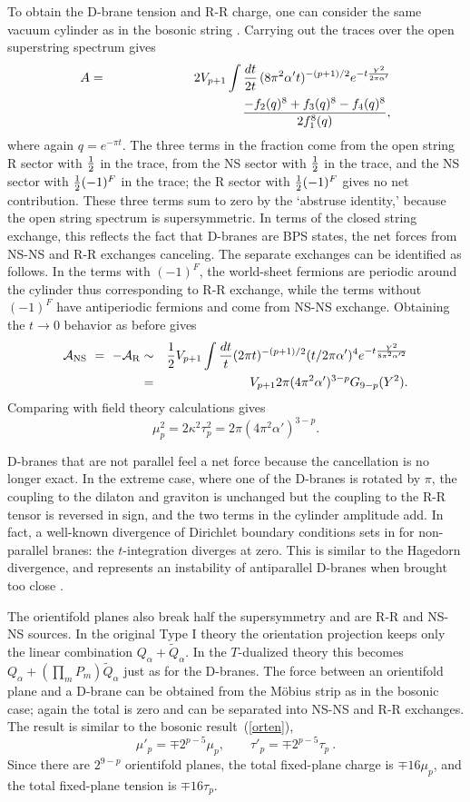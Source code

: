 \documentclass[12pt]{article}
\def\be{\begin{equation}}
\def\ee{\end{equation}}
\def\bea{\begin{eqnarray}}
\def\eea{\end{eqnarray}}
\def\ap{\alpha'}
\begin{document}
To obtain the D-brane tension and R-R charge, one can consider the same
vacuum cylinder as in the bosonic string \cite{joeone}.
Carrying out the traces over the open superstring spectrum
gives
\bea
A &=& 2V_{p+1} \int {dt\over 2t}\, (8\pi^2 \ap t)^{-(p+1)/2}
e^{- t{Y^2\over2\pi \alpha'}} 
\nonumber\\
&& \qquad\qquad\qquad\qquad\qquad \frac{ -f_2(q)^{8}
+ f_3(q)^8 - f_4(q)^8 }{2 f_1^8(q)},
\eea
where again $q =e^{-\pi t}$.
The three terms in the fraction come from the open string R
sector with ${1\over2}$ in the trace, from the NS sector with
${1\over2}$ in the trace, and the NS sector with ${1\over2} (-1)^F$
in the trace; the R sector with ${1\over2} (-1)^F$ gives no net
contribution.  These three terms sum to zero by the `abstruse
identity,' because the open string spectrum is supersymmetric.
In terms of the closed string exchange, this
reflects the fact that D-branes are BPS states, the net forces from
NS-NS and R-R exchanges canceling.  The separate exchanges can be
identified as follows.  In the terms with $(-1)^F$, the world-sheet
fermions are periodic around the cylinder thus corresponding to R-R
exchange, while the terms without $(-1)^F$ have antiperiodic fermions and
come from NS-NS exchange.  Obtaining the $t\to 0$ behavior as before
gives
\bea
{\cal A}_{\rm NS}\ =\ - {\cal A}_{\rm R} 
 &\sim & {1\over2} V_{p+1}  \int{dt\over t} (2\pi
t)^{-(p+1)/2} (t/2\pi\alpha')^4 e^{- t{Y^2\over8\pi^2 \alpha'^2}} 
\nonumber\\
&=& V_{p+1} 2\pi (4\pi^2\alpha')^{3-p} G_{9-p}(Y^2).
\eea 
Comparing with field theory calculations gives \cite{joeone}
\be
\mu_p^2 = 2 \kappa^2 \tau_p^2 = 2\pi (4\pi^2\alpha')^{3-p}. \label{dcharge}
\ee

D-branes that are not parallel feel a
net force because the cancellation is no longer exact.  In the extreme case,
where one of the D-branes is rotated by $\pi$, the coupling to the dilaton
and graviton is unchanged but the coupling to the R-R tensor is reversed in
sign, and the two terms in the cylinder amplitude add.  In fact, a
well-known divergence of Dirichlet boundary conditions sets in for
non-parallel branes: the
$t$-integration diverges at zero.  This is similar to the Hagedorn
divergence, and represents an instability of antiparallel D-branes when brought
too close \cite{tomlen}. 

The orientifold planes also break half the supersymmetry and are R-R and
NS-NS sources.  In the original Type I theory the orientation projection
keeps only the linear combination $Q_\alpha + \tilde
Q_\alpha$.  In the $T$-dualized theory this becomes $Q_\alpha + (\prod_m
P_m)
\tilde Q_\alpha$ just as for the D-branes.  The force between an
orientifold plane and a D-brane can be obtained from the M\"obius strip as
in the bosonic case; again the total is zero and can be separated into
NS-NS and R-R exchanges.  The result is similar to the bosonic
result~(\ref{orten}),
\be
\mu'_p = \mp 2^{p - 5} \mu_p, \qquad \tau'_p = \mp 2^{p - 5} \tau_p \ .
\ee
Since there are $2^{9-p}$ orientifold planes, the total fixed-plane charge
is $\mp 16 \mu_p$, and the total fixed-plane tension is $\mp 16 \tau_p$.
\end{document}
